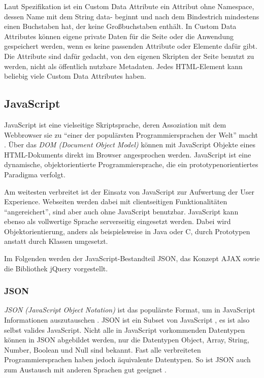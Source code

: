 Laut Spezifikation \cite{html5:data} ist ein Custom Data Attribute ein Attribut ohne Namespace, dessen Name mit dem String {\selectfont data-} beginnt und nach dem Bindestrich mindestens einen Buchstaben hat, der keine Großbuchstaben enthält. In Custom Data Attributes können eigene private Daten für die Seite oder die Anwendung gespeichert werden, wenn es keine passenden Attribute oder Elemente dafür gibt. Die Attribute sind dafür gedacht, von den eigenen Skripten der Seite benutzt zu werden, nicht als öffentlich nutzbare Metadaten. Jedes HTML-Element kann beliebig viele Custom Data Attributes haben.


\subsection{JavaScript}

JavaScript ist eine vielseitige Skriptsprache, deren Assoziation mit dem Webbrowser sie zu \enquote{einer der populärsten Programmiersprachen der Welt} macht . Über das \textit{DOM (Document Object Model)} \cite{dom:website} können mit JavaScript Objekte eines HTML-Dokuments direkt im Browser angesprochen werden. JavaScript ist eine dynamische, objektorientierte Programmiersprache, die ein prototypenorientiertes Paradigma verfolgt.

Am weitesten verbreitet ist der Einsatz von JavaScript zur Aufwertung der User Experience. Webseiten werden dabei mit clientseitigen Funktionalitäten \enquote{angereichert}, sind aber auch ohne JavaScript benutzbar. JavaScript kann ebenso als vollwertige Sprache serverseitig eingesetzt werden. Dabei wird Objektorientierung, anders als beispielsweise in Java oder C, durch Prototypen anstatt durch Klassen umgesetzt.

Im Folgenden werden der JavaScript-Bestandteil JSON, das Konzept AJAX sowie die Bibliothek jQuery vorgestellt.


\subsubsection{JSON}
\label{subsec:json}

\textit{JSON (JavaScript Object Notation)} ist das populärste Format, um in JavaScript Informationen auszutauschen . JSON ist ein Subset von JavaScript \cite{json:rfc}, es ist also selbst valides JavaScript. Nicht alle in JavaScript vorkommenden Datentypen können in JSON abgebildet werden, nur die Datentypen {\selectfont Object}, {\selectfont Array}, {\selectfont String}, {\selectfont Number}, {\selectfont Boolean} und {\selectfont Null} sind bekannt. Fast alle verbreiteten Programmiersprachen haben jedoch äquivalente Datentypen. So ist JSON auch zum Austausch mit anderen Sprachen gut geeignet \cite{json:crockford}.

